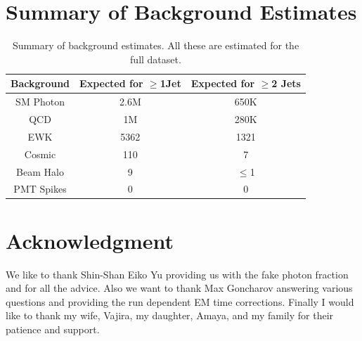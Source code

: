 \documentclass[11pt]{article}
\begin{document}


\section{Summary of Background Estimates}
\begin{table}[h]
\begin{center}
\begin{tabular} {|c|c|c|}
\hline
\bf{Background} & \bf{Expected for $\geq$1Jet} & \bf{Expected for $\geq$2 Jets} \\
\hline
SM Photon  			& 2.6M & 650K \\
\hline
QCD					& 1M & 280K \\
\hline
EWK					& 5362 & 1321 \\
\hline
Cosmic 				& 110 & 7 \\
\hline
Beam Halo			& 9 & $\le$1\\
\hline
PMT Spikes  		  	&  0 	 & 0 \\
\hline
\end{tabular}
\end{center}
\caption{Summary of background estimates. All these are estimated for the full dataset.}
\label{tab:bgsummary}
\end{table}



\section{Acknowledgment}
We like to thank Shin-Shan Eiko Yu providing us with the fake photon fraction and for all the advice. 
Also we want to thank Max Goncharov answering various questions and providing the run dependent EM time corrections. Finally I would like to thank my wife, Vajira, my daughter, Amaya, and my family for their patience and support.
\end{document}
